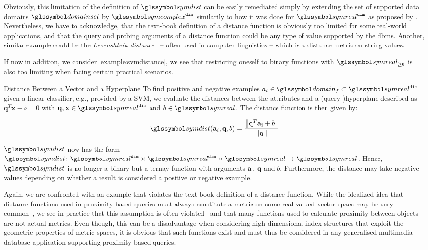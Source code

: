 Obviously, this limitation of the definition of $\symdist$ can be easily remediated simply by extending the set of supported data domains $\domainset$ by $\symcomplex^{\mathtt{dim}}$ similarily to how it was done for $\symreal^{\mathtt{dim}}$ as proposed by \cite{Giangreco:2018Database}. Nevertheless, we have to acknowledge, that the text-book definition of a distance function is obviously too limited for some real-world applications, and that the query and probing arguments of a distance function could be any type of value supported by the \acrshort{dbms}. Another, similar example could be the \emph{Levenshtein distance}~\cite{Levensthtein:1965Binary} -- often used in computer linguistics -- which is a distance metric on string values.

If now in addition, we consider \cref{example:svmdistance}, we see that restricting oneself to binary functions with $\symreal_{\geq 0}$ is also too limiting when facing certain practical scenarios.

\begin{example}[label=example:svmdistance]{Distance Between a Vector and a Hyperplane}{}
    To find positive and negative examples $a_{i} \in \domain_f \subset \symreal^{\mathtt{dim}}$ given a linear classifier, e.g., provided by a SVM, we evaluate the distances between the attributes and a (query-)hyperplane described as $\mathbf{q}^T\mathbf{x} - b = 0$ with $\mathbf{q},\mathbf{x} \in \symreal^{\mathtt{dim}}$ and $b \in \symreal$. The distance function is then given by:

    \begin{equation}
        \symdist (\mathbf{a}_i, \mathbf{q}, b) = \frac{\left\|\mathbf{q}^T \mathbf{a_i} + b \right\|}{\left\|\mathbf{q}\right\|}
    \end{equation}
    
    $\symdist$ now has the form $\symdist \colon \symreal^{\mathtt{dim}} \times \symreal^{\mathtt{dim}} \times \symreal \to \symreal$. Hence, $\symdist$ is no longer a binary but a ternay function with arguments $\mathbf{a_{i}}$, $\mathbf{q}$ and $b$. Furthermore, the distance may take negative values depending on whether a result is considered a positive or negative example.
\end{example}


Again, we are confronted with an example that violates the text-book definition of a distance function. While the idealized idea that distance functions used in proximity based queries must always constitute a metric on some real-valued vector space may be very common~\cite{Zezula:2006Similarity}, we see in practice that this assumption is often violated~\cite{Skopal:2011Nonmetric,Bernhauer:2019Nonmetric} and that many functions used to calculate proximity between objects are not actual metrics. Even though, this can be a disadvantage when considering high-dimensional index structures that exploit the geometric properties of metric spaces, it is obvious that such functions exist and must thus be considered in any generalised multimedia database application supporting proximity based queries. 

